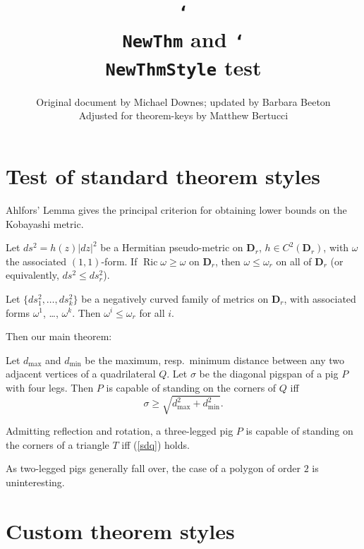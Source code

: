 \documentclass{article}
\title{\texttt{\char`\\ NewThm} and \texttt{\char`\\ NewThmStyle} test}
\author{%
  Original document by Michael Downes; updated by Barbara Beeton\\
  Adjusted for \textsf{theorem-keys} by Matthew Bertucci
  }
\let\lvert=|\let\rvert=|
\newcommand{\Ric}{\mathop{\mathrm{Ric}}\nolimits}
\begin{document}
\maketitle

\section{Test of standard theorem styles}

Ahlfors' Lemma gives the principal criterion for obtaining lower bounds
on the Kobayashi metric.

\begin{Ahlfors}
Let $ds^2 = h(z)\lvert dz\rvert^2$ be a Hermitian pseudo-metric on
$\mathbf{D}_r$, $h\in C^2(\mathbf{D}_r)$, with $\omega$ the associated
$(1,1)$-form. If $\Ric\omega\geq\omega$ on $\mathbf{D}_r$,
then $\omega\leq\omega_r$ on all of $\mathbf{D}_r$ (or equivalently,
$ds^2\leq ds_r^2$).
\end{Ahlfors}

\begin{lem}
Let $\{ds_1^2,\dots,ds_k^2\}$ be a negatively curved family of metrics
on $\mathbf{D}_r$, with associated forms $\omega^1$, \dots, $\omega^k$.
Then $\omega^i \leq\omega_r$ for all $i$.
\end{lem}

Then our main theorem:
\begin{thm}\label{pigspan}
Let $d_{\max}$ and $d_{\min}$ be the maximum, resp.\ minimum distance
between any two adjacent vertices of a quadrilateral $Q$. Let $\sigma$
be the diagonal pigspan of a pig $P$ with four legs.
Then $P$ is capable of standing on the corners of $Q$ iff
\begin{equation}\label{sdq}
\sigma\geq \sqrt{d_{\max}^2+d_{\min}^2}.
\end{equation}
\end{thm}

\begin{cor}
Admitting reflection and rotation, a three-legged pig $P$ is capable of
standing on the corners of a triangle $T$ iff (\ref{sdq}) holds.
\end{cor}

\begin{rmk}
As two-legged pigs generally fall over, the case of a polygon of order
$2$ is uninteresting.
\end{rmk}

\section{Custom theorem styles}
\end{document}
